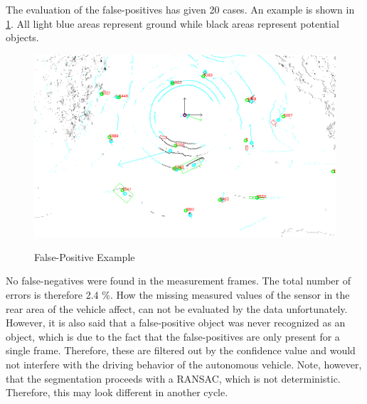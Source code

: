 \documentclass[11pt,oneside,openright]{mpreport}
\begin{document}
The evaluation of the false-positives has given 20 cases. An example is shown in \cref{false_pos_seg_1}. 
All light blue areas represent ground while black areas represent potential objects.
\begin{figure}[!htb]
  \caption{False-Positive Example} 
  \centering
  \includegraphics[width=\textwidth]{bilder/false_pos1.png}
 \label{false_pos_seg_1}
\end{figure}


No false-negatives were found in the measurement frames. The total number of errors is therefore 2.4 \%.
How the missing measured values of the sensor in the rear area of the vehicle affect, can not be evaluated by the data unfortunately.
However, it is also said that a false-positive object was never recognized as an object,
which is due to the fact that the false-positives are only present for a single frame.
Therefore, these are filtered out by the confidence value and would not interfere with the driving behavior of the autonomous vehicle.
Note, however, that the segmentation proceeds with a \ac{RANSAC}, which is not deterministic. Therefore, this may look different in another cycle.
\end{document}
